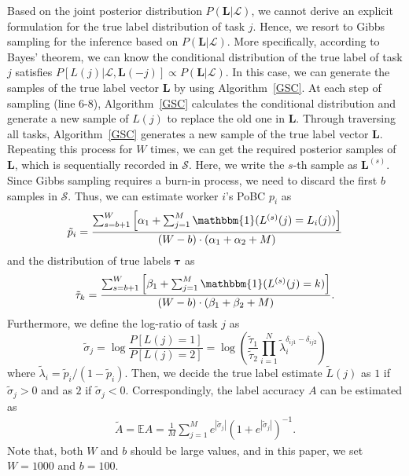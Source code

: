 Based on the joint posterior distribution $P(\bm{L}|\mathcal{L})$, we cannot derive an explicit formulation for the true label distribution of task $j$. Hence, we resort to Gibbs sampling for the inference based on $P(\bm{L}|\mathcal{L})$.
More specifically, according to Bayes' theorem, we can know the conditional distribution of the true label of task $j$ satisfies
$P[L(j)|\mathcal{L}, \bm{L}(-j)]\propto P(\bm{L}|\mathcal{L})$.
In this case, we can generate the samples of the true label vector $\bm{L}$ by using Algorithm~\ref{GSC}.
At each step of sampling (line 6-8), Algorithm~\ref{GSC} calculates the conditional distribution and generate a new sample of $L(j)$ to replace the old one in $\bm{L}$.
Through traversing all tasks, Algorithm~\ref{GSC} generates a new sample of the true label vector $\bm{L}$.
Repeating this process for $W$ times, we can get the required posterior samples of $\bm{L}$, which is sequentially recorded in $\mathcal{S}$.
Here, we write the $s$-th sample as $\bm{L}^{(s)}$.
Since Gibbs sampling requires a burn-in process, we need to discard the first $b$ samples in $\mathcal{S}$.
Thus, we can estimate worker $i$'s PoBC $p_i$ as
\begin{equation}
\label{p_infer}
\tilde{p}_{i}=\frac{\sum_{s=b+1}^{W}\left[\alpha_{1}+\sum_{j=1}^{M}\mathbbm{1}(L^{(s)}(j)=L_{i}(j))\right]}{(W-b)\cdot(\alpha_{1}+\alpha_{2}+M)}
\end{equation}
and the distribution of true labels $\bm{\tau}$ as
\begin{equation}
\label{tau_infer}
\tilde{\tau}_{k}=\frac{\sum_{s=b+1}^{W}\left[\beta_{1}+\sum_{j=1}^{M}\mathbbm{1}(L^{(s)}(j)=k)\right]}{(W-b)\cdot(\beta_{1}+\beta_{2}+M)}.
\end{equation}
Furthermore, we define the log-ratio of task $j$ as
\begin{equation}
\label{ProbRatio}
\tilde{\sigma}_j=\log\frac{P[L(j)=1]}{P[L(j)=2]}=\log\left(\frac{\tilde{\tau}_1}{\tilde{\tau}_2}\prod_{i=1}^{N}\tilde{\lambda}_i^{\delta_{ij1}-\delta_{ij2}}\right)
\end{equation}
where $\tilde{\lambda}_i = \tilde{p}_i/(1-\tilde{p}_i)$.
Then, we decide the true label estimate $\tilde{L}(j)$ as $1$ if $\tilde{\sigma}_j>0$ and as $2$ if $\tilde{\sigma}_j<0$.
Correspondingly, the label accuracy $A$ can be estimated as
\begin{equation}
\label{vot}
\begin{split}
\tilde{A}=\mathbb{E}A = \frac{1}{M}{\sum}_{j=1}^{M}e^{|\tilde{\sigma}_j|}\left(1+e^{|\tilde{\sigma}_j|}\right)^{-1}.
\end{split}
\end{equation}
Note that, both $W$ and $b$ should be large values, and in this paper, we set $W=1000$ and $b=100$.

